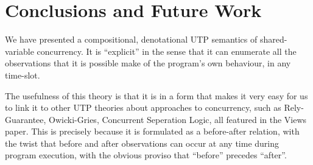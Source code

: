 \section{Conclusions and Future Work}\label{sec:conc}

We have presented a compositional, denotational UTP semantics
of shared-variable concurrency.
It is ``explicit'' in the sense that it can enumerate all the observations
that it is possible make of the program's own behaviour, in any time-slot.

The usefulness of this theory is that it is in a form that makes it very
easy for us to link it to other UTP theories about approaches to concurrency,
such as Rely-Guarantee\cite{DBLP:phd/ethos/Jones81,On-RG:vanStaden15},
Owicki-Gries\cite{DBLP:journals/acta/OwickiG76},
Concurrent Seperation Logic\cite{DBLP:journals/entcs/Brookes11},
all featured in the Views paper.
This is precisely because it is formulated as a before-after relation,
with the twist that before and after observations can occur at any time
during program execution, with the obvious proviso that
``before'' precedes ``after''.


